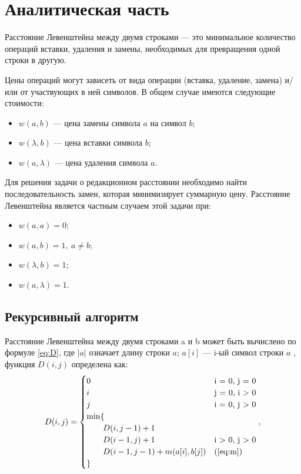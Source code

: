 \documentclass[a4paper,14pt, unknownkeysallowed]{extreport}
\begin{document}
\chapter{Аналитическая часть}

Расстояние Левенштейна между двумя строками — это минимальное количество операций вставки, удаления и замены, необходимых для превращения одной строки в другую.

Цены операций могут зависеть от вида операции (вставка, удаление, замена) и/или от участвующих в ней символов. В общем случае имеются следующие стоимости:
\begin{itemize}
	\item $w(a, b)$ — цена замены символа $a$ на символ $b$;
	\item $w(\lambda, b)$ — цена вставки символа $b$;
	\item $w(a, \lambda)$ — цена удаления символа $a$.
\end{itemize}

Для решения задачи о редакционном расстоянии необходимо найти последовательность замен, которая минимизирует суммарную цену. Расстояние Левенштейна является частным случаем этой задачи при:
\begin{itemize}
	\item $w(a, a) = 0$;
	\item $w(a, b) = 1, \medspace a \neq b$;
	\item $w(\lambda, b) = 1$;
	\item $w(a,\lambda) = 1$.
\end{itemize}

\clearpage

\section{Рекурсивный алгоритм}

Расстояние Левенштейна между двумя строками a и b может быть вычислено по формуле \ref{eq:D}, где $|a|$ означает длину строки $a$; $a[i]$ — i-ый символ строки $a$ , функция $D(i, j)$ определена как:
\begin{equation}
	\label{eq:D}
	D(i, j) = \begin{cases}
		0 &\text{i = 0, j = 0}\\
		i &\text{j = 0, i > 0}\\
		j &\text{i = 0, j > 0}\\
		\min \lbrace \\
			\qquad D(i, j - 1) + 1\\
			\qquad D(i - 1, j) + 1 &\text{i > 0, j > 0}\\
			\qquad D(i - 1, j - 1) + m(a[i], b[j]) &\text(\ref{eq:m})\\
		\rbrace
	\end{cases},
\end{equation}
\end{document}
